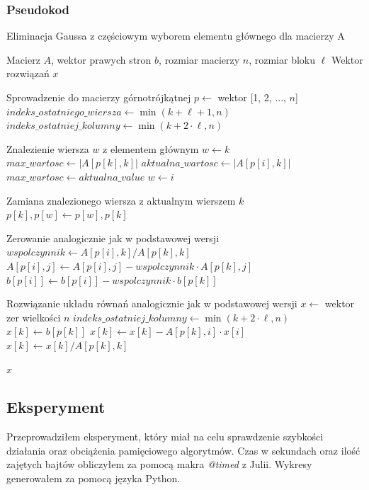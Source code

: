 \documentclass{article}
\begin{document}
\subsubsection{Pseudokod}
\begin{algorithm}[H]
\caption{Eliminacja Gaussa z częściowym wyborem elementu głównego dla macierzy A}
\begin{algorithmic}[1]
\Require Macierz $A$, wektor prawych stron $b$, rozmiar macierzy $n$, rozmiar bloku $\ell$
\Ensure Wektor rozwiązań $x$

\Comment Sprowadzenie do macierzy górnotrójkątnej
\State $p \gets$ wektor [1, 2, ..., $n$]
    \State $indeks\_ostatniego\_wiersza \gets \min(k + \ell + 1, n)$
    \State $indeks\_ostatniej\_kolumny \gets \min(k + 2 \cdot \ell, n)$
    
    \Comment Znalezienie wiersza $w$ z elementem głównym
    \State $w \gets k$
    \State $max\_wartosc \gets |A[p[k], k]|$
        \State $aktualna\_wartosc \gets |A[p[i], k]|$
            \State $max\_wartosc \gets aktualna\_value$
            \State $w \gets i$
        \EndIf
    \EndFor
    
    \Comment Zamiana znalezionego wiersza z aktualnym wierszem $k$
    \State $p[k], p[w] \gets p[w], p[k]$
    
    \Comment Zerowanie analogicznie jak w podstawowej wersji
        \State $wspolczynnik \gets A[p[i], k] / A[p[k], k]$
            \State $A[p[i], j] \gets A[p[i], j] - wspolczynnik \cdot A[p[k], j]$
        \EndFor
        \State $b[p[i]] \gets b[p[i]] - wspolczynnik \cdot b[p[k]]$
    \EndFor
\EndFor

\Comment Rozwiązanie układu równań analogicznie jak w podstawowej wersji
\State $x \gets$ wektor zer wielkości $n$
    \State $indeks\_ostatniej\_kolumny \gets \min(k + 2 \cdot \ell, n)$
    \State $x[k] \gets b[p[k]]$
        \State $x[k] \gets x[k] - A[p[k], i] \cdot x[i]$
    \EndFor
    \State $x[k] \gets x[k] / A[p[k], k]$
\EndFor

\noindent \Return $x$
\end{algorithmic}
\end{algorithm}

\subsection{Eksperyment}
Przeprowadziłem eksperyment, który miał na celu sprawdzenie szybkości działania oraz obciążenia pamięciowego algorytmów.
Czas w sekundach oraz ilość zajętych bajtów obliczyłem za pomocą makra \emph{@timed} z Julii.
Wykresy generowałem za pomocą języka Python.\\
\end{document}
